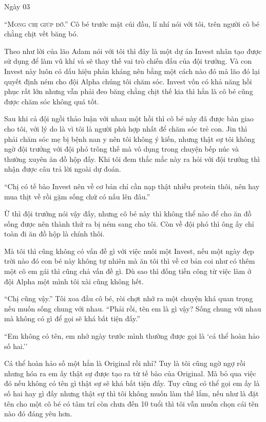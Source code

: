 {Ngày 03}
{
\noindent

\textsc{``Mong chị giúp đỡ.''}
 Cô bé trước mặt cúi đầu, lí nhí nói với tôi, trên
người cô bé chằng chịt vết băng bó.

Theo như lời của lão Adam nói với tôi thì đây là một dự án Invest nhân
tạo được sử dụng để làm vũ khí và sẽ thay thế vai trò chiến đấu của đội
trưởng. Và con Invest này luôn có dấu hiệu phản kháng nên bằng một cách
nào đó mà lão đó lại quyết định ném cho đội Alpha chúng tôi chăm sóc.
Invest vốn có khả năng hồi phục rất lớn nhưng vẫn phải đeo băng chằng
chịt thế kia thì hẳn là cô bé cũng được chăm sóc không quá tốt.

Sau khi cả đội ngồi thảo luận với nhau một hồi thì cô bé này đã được bàn
giao cho tôi, với lý do là vì tôi là người phù hợp nhất để chăm sóc trẻ
con. Jin thì phải chăm sóc mẹ bị bệnh nan y nên tôi không ý kiến, nhưng
thật sự tôi không ngờ đội trưởng với đội phó trông thế mà vô dụng trong
chuyện bếp núc và thường xuyên ăn đồ hộp đấy. Khi tôi đem thắc mắc này
ra hỏi với đội trưởng thì nhận được câu trả lời ngoài dự đoán.

``Chị có tế bào Invest nên về cơ bản chỉ cần nạp thật nhiều protein
thôi, nên hay mua thịt về rồi gặm sống chứ có nấu lên đâu.''

Ừ thì đội trưởng nói vậy đấy, nhưng cô bé này thì không thể nào để cho
ăn đồ sống được nên thành thử ra bị ném sang cho tôi. Còn về đội phó thì
ông ấy chỉ toàn đi ăn đồ hộp là chính thôi.

Mà tôi thì cũng không có vấn đề gì với việc nuôi một Invest, nếu một
ngày đẹp trời nào đó con bé này không tự nhiên mà ăn tôi thì về cơ bản
coi như có thêm một cô em gái thì cũng chả vấn đề gì. Dù sao thì đống
tiền công từ việc làm ở đội Alpha một mình tôi xài cũng không hết.

``Chị cũng vậy.'' Tôi xoa đầu cô bé, ròi chợt nhớ ra một chuyện khá quan
trọng nếu muốn sống chung với nhau. ``Phải rồi, tên em là gì vậy? Sống
chung với nhau mà không có gì để gọi sẽ khá bất tiện đấy.''

``Em không có tên, em nhớ ngày trước mình thường được gọi là `cá thể
hoàn hảo số hai.''

Cá thể hoàn hảo số một hẳn là Original rồi nhỉ? Tuy là tôi cũng ngờ ngợ
rồi nhưng hóa ra em ấy thật sự được tạo ra từ tế bào của Original. Mà bỏ
qua việc đó nếu không có tên gì thật sự sẽ khá bất tiện đấy. Tuy cũng có
thể gọi em ấy là số hai hay gì đấy nhưng thật sự thì tôi không muốn làm
thế lắm, nếu như là đặt tên cho một cô bé có tâm trí còn chưa đến 10
tuổi thì tôi vẫn muốn chọn cái tên nào đó đáng yêu hơn.

}
